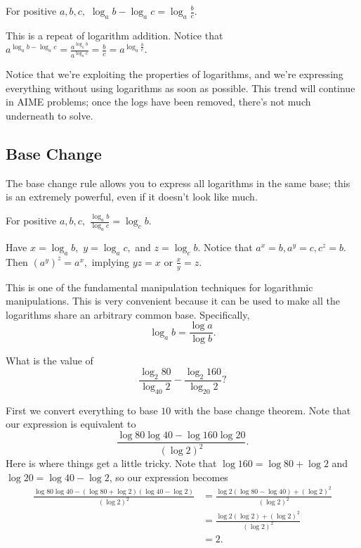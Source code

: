\begin{theo}
For positive $a,b,c,$ $\log_{a}b-\log_{a}c=\log_{a}{\frac{b}{c}}.$
\end{theo}

\begin{pro}
This is a repeat of logarithm addition. Notice that $a^{\log_ab-\log_ac}=\frac{a^{\log_ab}}{ a^{\log_ac}}=\frac{b}{c}=a^{\log_a\frac{b}{c}}.$
\end{pro}

Notice that we're exploiting the properties of logarithms, and we're expressing everything without using logarithms as soon as possible. This trend will continue in AIME problems; once the logs have been removed, there's not much underneath to solve.

\subsection{Base Change}
The base change rule allows you to express all logarithms in the same base; this is an extremely powerful, even if it doesn't look like much.

\begin{theo}
For positive $a,b,c,$ $\frac{\log_{a}b}{\log_{a}c}=\log_{c}b.$
\end{theo}

\begin{pro}
Have $x=\log_ab,$ $y=\log_ac,$ and $z=\log_cb.$ Notice that $a^x=b,a^y=c,c^z=b.$ Then $(a^y)^z=a^x,$ implying $yz=x$ or $\frac{x}{y}=z.$
\end{pro}

This is one of the fundamental manipulation techniques for logarithmic manipulations. This is very convenient because it can be used to make all the logarithms share an arbitrary common base. Specifically,
\[\log_ab=\frac{\log a}{\log b}.\]

\begin{exam}[AMC 12B 2021/9]
What is the value of \[\frac{\log_2 80}{\log_{40}2}-\frac{\log_2 160}{\log_{20}2}?\]
\end{exam}

\begin{sol}
First we convert everything to base $10$ with the base change theorem. Note that our expression is equivalent to
\[\frac{\log 80\log 40 - \log 160\log 20}{(\log 2)^2}.\]
Here is where things get a little tricky. Note that $\log 160 = \log 80 + \log 2$ and $\log 20 = \log 40 - \log 2$, so our expression becomes
\begin{align*}
\frac{\log 80\log 40 - (\log 80+\log 2)(\log 40-\log 2)}{(\log 2)^2}&=\frac{\log 2(\log 80-\log 40)+(\log 2)^2}{(\log 2)^2} \\
&=\frac{\log 2(\log 2)+(\log 2)^2}{(\log 2)^2} \\
&=2.
\end{align*}
\end{sol}

